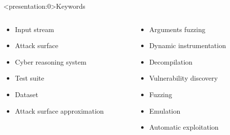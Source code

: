 \begin{frame}<presentation:0>{Keywords}
    \begin{columns}
        \begin{column}{0.5\textwidth}
            \begin{itemize}
                \item Input stream
                \item Attack surface
                \item Cyber reasoning system
                \item Test suite
                \item Dataset
                \item Attack surface approximation
            \end{itemize}
        \end{column}
        \begin{column}{0.5\textwidth}
            \begin{itemize}
                \item Arguments fuzzing
                \item Dynamic instrumentation
                \item Decompilation
                \item Vulnerability discovery
                \item Fuzzing
                \item Emulation
                \item Automatic exploitation
            \end{itemize}
        \end{column}
    \end{columns}
\end{frame}